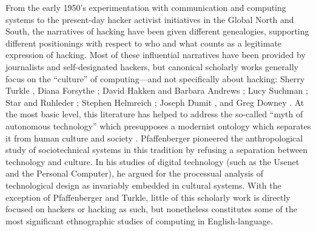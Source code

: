 \documentclass[10pt,letter,oneside]{scrartcl}
\begin{document}
From the early 1950's experimentation with communication and computing systems
to the present-day hacker activist initiatives in the Global North and South,
the narratives of hacking have been given different genealogies, supporting
different positionings with respect to who and what counts as a legitimate
expression of hacking.  Most of these influential narratives have been provided
by journalists and self-designated hackers, but canonical scholarly works
generally focus on the ``culture'' of computing---and not specifically about
hacking: Sherry Turkle \parencite*{turkle_life_1995,turkle_second_1984}, Diana
Forsythe \parencite*{forsythe_studying_2001}; David Hakken and Barbara Andrews
\parencite*{hakken_computing_1993}; Lucy Suchman \parencite*{suchman_plans_1987}; Star and
Ruhleder \parencite*{star_infrastructure_1996}; Stephen Helmreich
\parencite*{helmreich_silicon_1998}; Joseph Dumit \parencite*{dumit_picturing_2004}, and
Greg Downey \parencite*{downey_machine_1998}. At the most basic level, this
literature has helped to address the so-called ``myth of autonomous technology''
which presupposes a modernist ontology which separates it from human culture and
society \autocite{latour_wehave_2008,winner_auto_1978,}.  Pfaffenberger
\parencite*{pfaffenberger_social_1992} pioneered the anthropological study of
sociotechnical systems in this tradition by refusing a separation between
technology and culture. In his studies of digital technology (such as the Usenet
and the Personal Computer), he argued for the processual analysis of
technological design as invariably embedded in cultural systems. With the
exception of Pfaffenberger and Turkle, little of this scholarly work is directly
focused on hackers or hacking as such, but nonetheless constitutes some of the
most significant ethnographic studies of computing in English-language.
\end{document}
